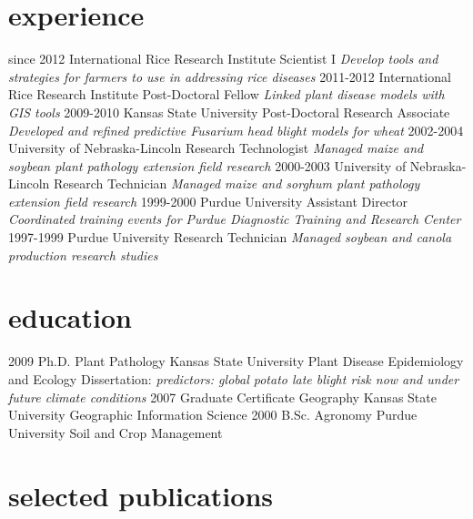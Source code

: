\documentclass[]{friggeri-cv}
\begin{document}
\section{experience}
\begin{entrylist}
  \entry
    {since 2012}
    {International Rice Research Institute }
    {Scientist I}
    {\emph{Develop tools and strategies for farmers to use in addressing rice diseases}}
  \entry
    {2011-2012}
    {International Rice Research Institute }
    {Post-Doctoral Fellow}
    {\emph{Linked plant disease models with GIS tools}}
  \entry
    {2009-2010}
    {Kansas State University}
    {Post-Doctoral Research Associate}
    {\emph{Developed and refined predictive Fusarium head blight models for wheat}}
  \entry
   {2002-2004}
   {University of Nebraska-Lincoln}
   {Research Technologist}
   {\emph{Managed maize and soybean plant pathology extension field research}}
  \entry
   {2000-2003}
   {University of Nebraska-Lincoln}
   {Research Technician}
   {\emph{Managed maize and sorghum plant pathology extension field research}}
  \entry
   {1999-2000}
   {Purdue University}
   {Assistant Director}
   {\emph{Coordinated training events for Purdue Diagnostic Training and Research Center}}
  \entry
   {1997-1999}
   {Purdue University}
   {Research Technician}
   {\emph{Managed soybean and canola production research studies}}
\end{entrylist}

\section{education}

\begin{entrylist}
  \entry
    {2009}
    {Ph.D. {\normalfont Plant Pathology}}
    {Kansas State University}
    {Plant Disease Epidemiology and Ecology}
  \entry
    {}
    {Dissertation: }
    {}
    {\emph{predictors: global potato late blight risk now and under future climate conditions}}
 \entry
    {2007}
    {Graduate Certificate {\normalfont Geography}}
    {Kansas State University}
    {Geographic Information Science}
  \entry
    {2000}
    {B.Sc. {\normalfont Agronomy}}
    {Purdue University}
    {Soil and Crop Management}
\end{entrylist}

\section{selected publications}
\end{document}
